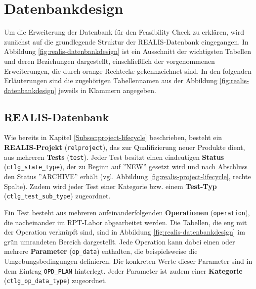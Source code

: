 \section{Datenbankdesign}
Um die Erweiterung der Datenbank für den Feasibility Check zu erklären, wird zunächst auf die grundlegende Struktur der REALIS-Datenbank eingegangen. In Abbildung \ref{fig:realis-datenbankdesign} ist ein Ausschnitt der wichtigsten Tabellen und deren Beziehungen dargestellt, einschließlich der vorgenommenen Erweiterungen, die durch orange Rechtecke gekennzeichnet sind. In den folgenden Erläuterungen sind die zugehörigen Tabellennamen aus der Abbildung \ref{fig:realis-datenbankdesign} jeweils in Klammern angegeben.

\subsection{REALIS-Datenbank}

Wie bereits in Kapitel \ref{Subsec:project-lifecycle} beschrieben, besteht ein \textbf{REALIS-Projekt} (\texttt{relproject}), das zur Qualifizierung neuer Produkte dient, aus mehreren \textbf{Tests} (\texttt{test}). Jeder Test besitzt einen eindeutigen \textbf{Status} (\texttt{ctlg\_state\_type}), der zu Beginn auf ''NEW'' gesetzt wird und nach Abschluss den Status ''ARCHIVE'' erhält (vgl. Abbildung \ref{fig:realis-project-lifecycle}, rechte Spalte). Zudem wird jeder Test einer Kategorie bzw. einem \textbf{Test-Typ} (\texttt{ctlg\_test\-\_sub\_type}) zugeordnet.

Ein Test besteht aus mehreren aufeinanderfolgenden \textbf{Operationen} (\texttt{operation}), die nacheinander im \gls{RPT}-Labor abgearbeitet werden. Die Tabellen, die eng mit der Operation verknüpft sind, sind in Abbildung \ref{fig:realis-datenbankdesign} im grün umrandeten Bereich dargestellt. Jede Operation kann dabei einen oder mehrere \textbf{Parameter} (\texttt{op\_data}) enthalten, die beispielsweise die Umgebungsbedingungen definieren. Die konkreten Werte dieser Parameter sind in dem Eintrag \texttt{OPD\_PLAN} hinterlegt. Jeder Parameter ist zudem einer \textbf{Kategorie} (\texttt{ctlg\_op\_\-data\_type}) zugeordnet.  


